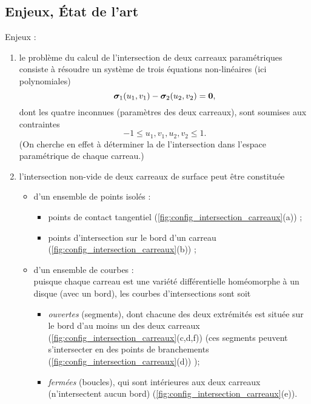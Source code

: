 \subsection{Enjeux, État de l'art}
Enjeux :
\begin{enumerate}
	\item le problème du calcul de l'intersection de deux carreaux paramétriques consiste à résoudre un système de trois équations non-linéaires (ici polynomiales)
	\begin{equation}
		\bm{\sigma}_1(u_1,v_1) - \bm{\sigma}_2(u_2, v_2) = \bm{0},
		\label{eq:intersection_2_carreaux}
	\end{equation}
	dont les quatre inconnues (paramètres des deux carreaux), sont soumises aux contraintes
	\begin{equation}
		-1 \leq u_1, v_1, u_2, v_2 \leq 1.
	\end{equation}
	(On cherche en effet à déterminer la  de l'intersection dans l'espace paramétrique de chaque carreau.)
	
	\item l'intersection non-vide de deux carreaux de surface peut être constituée
	\begin{itemize}
		\item d'un ensemble de points isolés :
		\begin{itemize}
			\item points de contact tangentiel (\autoref{fig:config_intersection_carreaux}(a)) ;
			\item points d'intersection sur le bord d'un carreau (\autoref{fig:config_intersection_carreaux}(b)) ;
		\end{itemize}
		\item d'un ensemble de courbes :\\
		puisque chaque carreau est une variété différentielle homéomorphe à un disque (\ie avec un bord), les courbes d'intersections sont soit 
		\begin{itemize}
			\item \textit{ouvertes} (segments), dont chacune des deux extrémités est située sur le bord d'au moins un des deux carreaux (\autoref{fig:config_intersection_carreaux}(c,d,f)) (ces segments peuvent s'intersecter en des points de branchements (\autoref{fig:config_intersection_carreaux}(d)) );
			\item \textit{fermées} (boucles), qui sont intérieures aux deux carreaux (\ie n'intersectent aucun bord) (\autoref{fig:config_intersection_carreaux}(e)).
		\end{itemize}
	

\end{itemize}
\end{enumerate}
